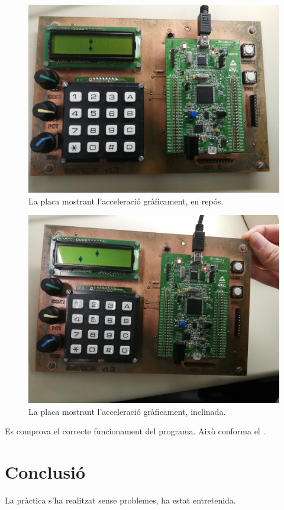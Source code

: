 \begin{figure}[p] %
  \includegraphics[width=.82\columnwidth]{../photos/board/p3-dots-initial}
  \caption{ \label{fig:p3-board-dots-initial} La placa mostrant l'acceleració gràficament, en repós. }
\end{figure}
\begin{figure}[p]
  \includegraphics[width=.82\columnwidth]{../photos/board/p3-dots-tilt_1}
  \caption{ \label{fig:p3-board-dots-tilt} La placa mostrant l'acceleració gràficament, inclinada. }
\end{figure}

Es comprova el correcte funcionament del programa. Això conforma el
.


\section{Conclusió}

La pràctica s'ha realitzat sense problemes, ha estat entretenida.

